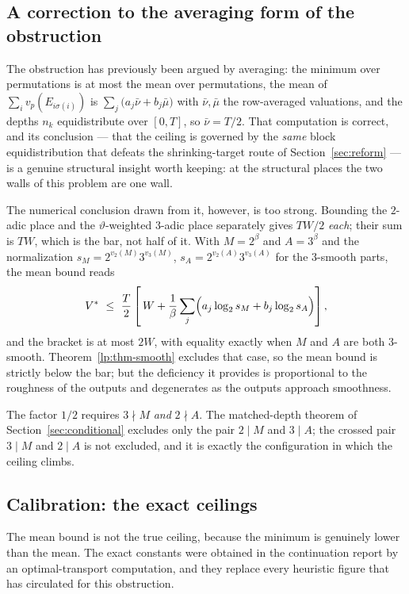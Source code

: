 \documentclass[11pt,oneside]{article}
\theoremstyle{definition}
\theoremstyle{remark}
\newcommand{\thetaq}{\vartheta}
\newcommand{\vpp}[2]{v_{#1}\!\left(#2\right)}
\begin{document}
\subsection{A correction to the averaging form of the obstruction}

The obstruction has previously been argued by averaging: the minimum over permutations is at
most the mean over permutations, the mean of $\sum_iv_p(E_{i\sigma(i)})$ is
$\sum_j\bigl(a_j\bar\nu+b_j\bar\mu\bigr)$ with $\bar\nu,\bar\mu$ the row-averaged valuations,
and the depths $n_k$ equidistribute over $[0,T]$, so $\bar\nu=T/2$.  That computation is
correct, and its conclusion --- that the ceiling is governed by the \emph{same} block
equidistribution that defeats the shrinking-target route of Section~\ref{sec:reform} --- is a
genuine structural insight worth keeping: at the structural places the two walls of this
problem are one wall.

The numerical conclusion drawn from it, however, is too strong.  Bounding the $2$-adic place
and the $\thetaq$-weighted $3$-adic place separately gives $TW/2$ \emph{each}; their sum is
$TW$, which is the bar, not half of it.  With $M=2^{\beta}$ and $A=3^{\beta}$ and the
normalization $s_M=2^{\vpp2M}3^{\vpp3M}$, $s_A=2^{\vpp2A}3^{\vpp3A}$ for the $3$-smooth parts,
the mean bound reads
\begin{equation}
  V^{*}\ \le\ \frac{T}{2}\left[\,W+\frac1\beta\sum_j\Bigl(a_j\log_2s_M+b_j\log_2s_A\Bigr)\right],
  \label{eq:mp-mean}
\end{equation}
and the bracket is at most $2W$, with equality exactly when $M$ and $A$ are both $3$-smooth.
Theorem~\ref{lp:thm-smooth} excludes that case, so the mean bound is strictly below the bar;
but the deficiency it provides is proportional to the roughness of the outputs and degenerates
as the outputs approach smoothness.

The factor $1/2$ requires $3\nmid M$ \emph{and} $2\nmid A$.  The matched-depth theorem of
Section~\ref{sec:conditional} excludes only the pair $2\mid M$ and $3\mid A$; the crossed pair
$3\mid M$ and $2\mid A$ is not excluded, and it is exactly the configuration in which the
ceiling climbs.

\subsection{Calibration: the exact ceilings}

The mean bound is not the true ceiling, because the minimum is genuinely lower than the mean.
The exact constants were obtained in the continuation report by an optimal-transport
computation, and they replace every heuristic figure that has circulated for this obstruction.
\end{document}
